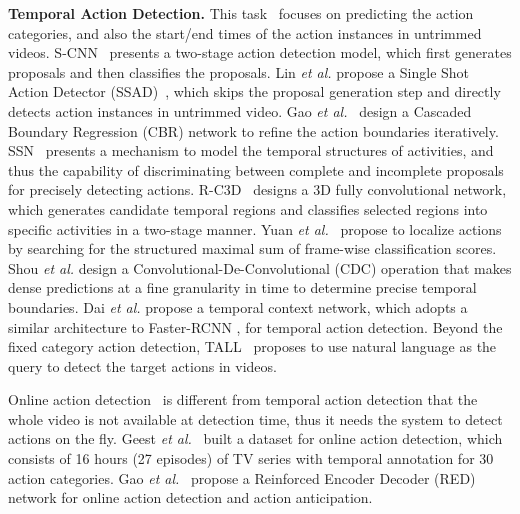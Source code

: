 \documentclass[runningheads]{llncs}
\begin{document}
\textbf{Temporal Action Detection.} This task~\cite{Shou_2016_CVPR,Yeung_2016_CVPR,sun2015temporal,Yuan_2016_CVPR} focuses on predicting the action categories, and also the start/end times of the action instances in untrimmed videos. S-CNN~\cite{Shou_2016_CVPR} presents a two-stage action detection model, which first generates proposals and then classifies the proposals. Lin \emph{et al.} propose a Single Shot Action Detector (SSAD)~\cite{lin2017single}, which skips the proposal generation step and directly detects action instances in untrimmed video. Gao \emph{et al.}~\cite{gao2017cascaded} design a Cascaded Boundary Regression (CBR) network to refine the action boundaries iteratively. SSN~\cite{Zhao_2017_ICCV} presents a mechanism to model the temporal structures of activities, and thus the capability of discriminating between complete and incomplete proposals for precisely detecting actions. R-C3D~\cite{Xu_2017_ICCV} designs a 3D fully convolutional network, which generates candidate temporal regions and classifies selected regions into specific activities in a two-stage manner. Yuan \emph{et al.}~\cite{Yuan_2017_CVPR} propose to localize actions by searching for the structured maximal sum of frame-wise classification scores. Shou \emph{et al.} \cite{Shou_2017_CVPR} design a Convolutional-De-Convolutional (CDC) operation that makes dense predictions at a fine granularity in time to determine precise temporal boundaries. Dai \emph{et al.} \cite{Dai_2017_ICCV} propose a temporal context network, which adopts a similar architecture to Faster-RCNN \cite{ren2015faster}, for temporal action detection.
Beyond the fixed category action detection, TALL~\cite{Gao_2017_TALL} proposes to use natural language as the query to detect the target actions in videos.

Online action detection~\cite{de2016online,gao2017red,shou2018online} is different from temporal action detection that the whole video is not available at detection time, thus it needs the system to detect actions on the fly. Geest \textit{et al.}~\cite{de2016online} built a dataset for online action detection, which consists of 16 hours (27 episodes) of TV series with temporal annotation for 30 action categories. Gao \emph{et al.}~\cite{gao2017red} propose a Reinforced Encoder Decoder (RED) network for online action detection and action anticipation. 
\end{document}
